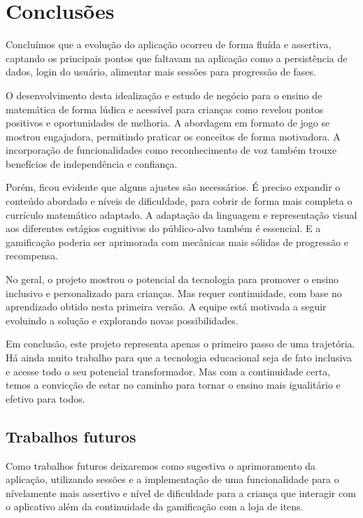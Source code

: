 \chapter{Conclusões}\label{chp:conc}

Concluímos que a evolução do aplicação ocorreu de forma fluída e assertiva, captando os principais pontos que faltavam na aplicação como a persistência de dados, login do usuário, alimentar mais sessões para progressão de fases. 

O desenvolvimento desta idealização e estudo de negócio para o ensino de matemática de forma lúdica e acessível para crianças como revelou pontos positivos e oportunidades de melhoria. A abordagem em formato de jogo se mostrou engajadora, permitindo praticar os conceitos de forma motivadora. A incorporação de funcionalidades como reconhecimento de voz também trouxe benefícios de independência e confiança.

Porém, ficou evidente que alguns ajustes são necessários. É preciso expandir o conteúdo abordado e níveis de dificuldade, para cobrir de forma mais completa o currículo matemático adaptado. A adaptação da linguagem e representação visual aos diferentes estágios cognitivos do público-alvo também é essencial. E a gamificação poderia ser aprimorada com mecânicas mais sólidas de progressão e recompensa.

No geral, o projeto mostrou o potencial da tecnologia para promover o ensino inclusivo e personalizado para crianças. Mas requer continuidade, com base no aprendizado obtido nesta primeira versão. A equipe está motivada a seguir evoluindo a solução e explorando novas possibilidades.


Em conclusão, este projeto representa apenas o primeiro passo de uma trajetória. Há ainda muito trabalho para que a tecnologia educacional seja de fato inclusiva e acesse todo o seu potencial transformador. Mas com a continuidade certa, temos a convicção de estar no caminho para tornar o ensino mais igualitário e efetivo para todos.



\section{Trabalhos futuros}

Como trabalhos futuros deixaremos como sugestiva o aprimoramento da aplicação, utilizando sessões e a implementação  de uma funcionalidade para o nívelamente mais assertivo e nível de dificuldade para a criança que interagir com o aplicativo além da continuidade da gamificação com a loja de itens. 



